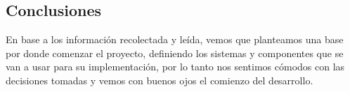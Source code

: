\subsection{Conclusiones}
En base a los información recolectada y leída, vemos que planteamos una base por donde comenzar el proyecto, definiendo los sistemas y componentes que se van a usar para su implementación, por lo tanto nos sentimos cómodos con las decisiones tomadas y vemos con buenos ojos el comienzo del desarrollo.